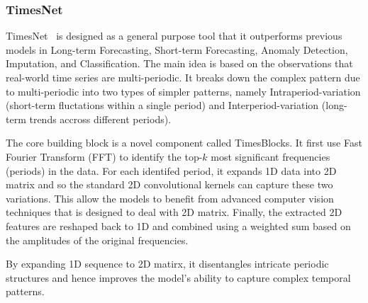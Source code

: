 \subsubsection{TimesNet} %


TimesNet~\cite{wu2022timesnet} is designed as a general purpose tool that it outperforms previous models in Long-term Forecasting, Short-term Forecasting, Anomaly Detection, Imputation, and Classification.
%
The main idea is based on the observations that real-world time series are multi-periodic.
It breaks down the complex pattern due to multi-periodic into two types of simpler patterns, namely Intraperiod-variation (short-term fluctations within a single period) and Interperiod-variation (long-term trends accross different periods).
%

The core building block is a novel component called TimesBlocks.
It first use Fast Fourier Transform (FFT) to identify the top-$k$ most significant frequencies (periods) in the data.
For each identifed period, it expands 1D data into 2D matrix and so the standard 2D convolutional kernels can capture these two variations.
This allow the models to benefit from advanced computer vision techniques that is designed to deal with 2D matrix.
Finally, the extracted 2D features are reshaped back to 1D and combined using a weighted sum based on the amplitudes of the original frequencies. 

By expanding 1D sequence to 2D matirx, it disentangles intricate periodic structures and hence improves the model's ability to capture complex temporal patterns.




























